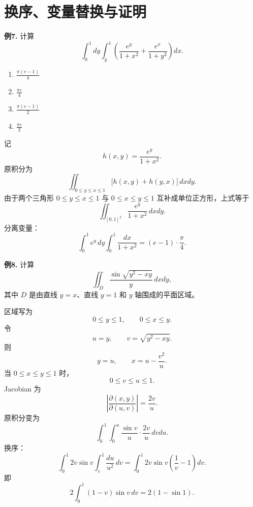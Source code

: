 \section{换序、变量替换与证明}

\begin{problemblock}
\textbf{例7.} 计算
\[
\int_0^1dy\int_y^1
\left(\frac{e^y}{1+x^2}+\frac{e^x}{1+y^2}\right)dx.
\]
\begin{enumerate}[label=\Alph*., leftmargin=2.2em]
\item \(\displaystyle \frac{\pi(e-1)}4\)
\item \(\displaystyle \frac{\pi e}{4}\)
\item \(\displaystyle \frac{\pi(e-1)}2\)
\item \(\displaystyle \frac{\pi e}{2}\)
\end{enumerate}
\end{problemblock}
\begin{solutionblock}
记
\[
h(x,y)=\frac{e^y}{1+x^2}.
\]
原积分为
\[
\iint_{0\le y\le x\le1}\bigl[h(x,y)+h(y,x)\bigr]\,dxdy.
\]
由于两个三角形 \(0\le y\le x\le1\) 与 \(0\le x\le y\le1\) 互补成单位正方形，上式等于
\[
\iint_{[0,1]^2}\frac{e^y}{1+x^2}\,dxdy.
\]
分离变量：
\[
\int_0^1e^y\,dy\int_0^1\frac{dx}{1+x^2}
=(e-1)\cdot\frac\pi4.
\]
\end{solutionblock}

\begin{problemblock}
\textbf{例8.} 计算
\[
\iint_D\frac{\sin\sqrt{y^2-xy}}{y}\,dxdy,
\]
其中 \(D\) 是由直线 \(y=x\)、直线 \(y=1\) 和 \(y\) 轴围成的平面区域。
\end{problemblock}
\begin{solutionblock}
区域写为
\[
0\le y\le1,\qquad 0\le x\le y.
\]
令
\[
u=y,\qquad v=\sqrt{y^2-xy}.
\]
则
\[
y=u,\qquad x=u-\frac{v^2}{u}.
\]
当 \(0\le x\le y\le1\) 时，
\[
0\le v\le u\le1.
\]
Jacobian 为
\[
\left|\frac{\partial(x,y)}{\partial(u,v)}\right|
=\frac{2v}{u}.
\]
原积分变为
\[
\int_0^1\int_0^u \frac{\sin v}{u}\cdot\frac{2v}{u}\,dvdu.
\]
换序：
\[
\int_0^1 2v\sin v\int_v^1\frac{du}{u^2}\,dv
=\int_0^1 2v\sin v\left(\frac1v-1\right)dv.
\]
即
\[
2\int_0^1(1-v)\sin v\,dv
=2(1-\sin1).
\]
\end{solutionblock}

